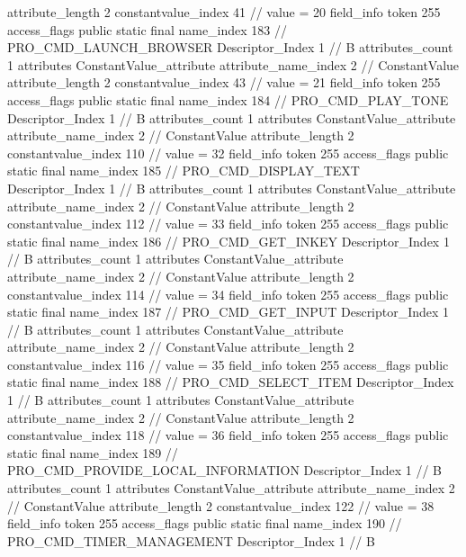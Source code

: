 {{{{{{{					attribute_length	2
					constantvalue_index	41		// value = 20
				}
				}
			}
			field_info {
				token	255
				access_flags	public static final
				name_index	183		// PRO_CMD_LAUNCH_BROWSER
				Descriptor_Index	1		// B
				attributes_count	1
				attributes {
				ConstantValue_attribute {
					attribute_name_index	2		// ConstantValue
					attribute_length	2
					constantvalue_index	43		// value = 21
				}
				}
			}
			field_info {
				token	255
				access_flags	public static final
				name_index	184		// PRO_CMD_PLAY_TONE
				Descriptor_Index	1		// B
				attributes_count	1
				attributes {
				ConstantValue_attribute {
					attribute_name_index	2		// ConstantValue
					attribute_length	2
					constantvalue_index	110		// value = 32
				}
				}
			}
			field_info {
				token	255
				access_flags	public static final
				name_index	185		// PRO_CMD_DISPLAY_TEXT
				Descriptor_Index	1		// B
				attributes_count	1
				attributes {
				ConstantValue_attribute {
					attribute_name_index	2		// ConstantValue
					attribute_length	2
					constantvalue_index	112		// value = 33
				}
				}
			}
			field_info {
				token	255
				access_flags	public static final
				name_index	186		// PRO_CMD_GET_INKEY
				Descriptor_Index	1		// B
				attributes_count	1
				attributes {
				ConstantValue_attribute {
					attribute_name_index	2		// ConstantValue
					attribute_length	2
					constantvalue_index	114		// value = 34
				}
				}
			}
			field_info {
				token	255
				access_flags	public static final
				name_index	187		// PRO_CMD_GET_INPUT
				Descriptor_Index	1		// B
				attributes_count	1
				attributes {
				ConstantValue_attribute {
					attribute_name_index	2		// ConstantValue
					attribute_length	2
					constantvalue_index	116		// value = 35
				}
				}
			}
			field_info {
				token	255
				access_flags	public static final
				name_index	188		// PRO_CMD_SELECT_ITEM
				Descriptor_Index	1		// B
				attributes_count	1
				attributes {
				ConstantValue_attribute {
					attribute_name_index	2		// ConstantValue
					attribute_length	2
					constantvalue_index	118		// value = 36
				}
				}
			}
			field_info {
				token	255
				access_flags	public static final
				name_index	189		// PRO_CMD_PROVIDE_LOCAL_INFORMATION
				Descriptor_Index	1		// B
				attributes_count	1
				attributes {
				ConstantValue_attribute {
					attribute_name_index	2		// ConstantValue
					attribute_length	2
					constantvalue_index	122		// value = 38
				}
				}
			}
			field_info {
				token	255
				access_flags	public static final
				name_index	190		// PRO_CMD_TIMER_MANAGEMENT
				Descriptor_Index	1		// B
}}}}}
